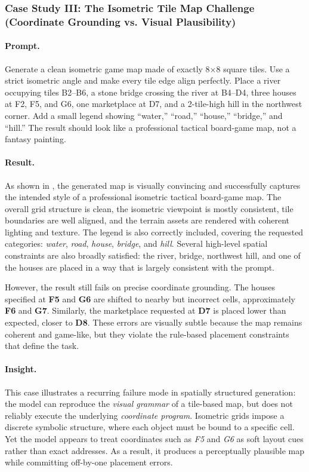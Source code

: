 \documentclass{llmxive}
\begin{document}
\subsubsection{Case Study III: The Isometric Tile Map Challenge (Coordinate Grounding vs. Visual Plausibility)}
\label{subsubsec:isometric_tile_map_case}

\paragraph{Prompt.}
Generate a clean isometric game map made of exactly 8$\times$8 square tiles. Use a strict isometric angle and make every tile edge align perfectly. Place a river occupying tiles B2--B6, a stone bridge crossing the river at B4--D4, three houses at F2, F5, and G6, one marketplace at D7, and a 2-tile-high hill in the northwest corner. Add a small legend showing ``water,'' ``road,'' ``house,'' ``bridge,'' and ``hill.'' The result should look like a professional tactical board-game map, not a fantasy painting.

\paragraph{Result.}
As shown in , the generated map is visually convincing and successfully captures the intended style of a professional isometric tactical board-game map. The overall grid structure is clean, the isometric viewpoint is mostly consistent, tile boundaries are well aligned, and the terrain assets are rendered with coherent lighting and texture. The legend is also correctly included, covering the requested categories: \textit{water}, \textit{road}, \textit{house}, \textit{bridge}, and \textit{hill}. Several high-level spatial constraints are also broadly satisfied: the river, bridge, northwest hill, and one of the houses are placed in a way that is largely consistent with the prompt.

However, the result still fails on precise coordinate grounding. The houses specified at \textbf{F5} and \textbf{G6} are shifted to nearby but incorrect cells, approximately \textbf{F6} and \textbf{G7}. Similarly, the marketplace requested at \textbf{D7} is placed lower than expected, closer to \textbf{D8}. These errors are visually subtle because the map remains coherent and game-like, but they violate the rule-based placement constraints that define the task.

\paragraph{Insight.}
This case illustrates a recurring failure mode in spatially structured generation: the model can reproduce the \emph{visual grammar} of a tile-based map, but does not reliably execute the underlying \emph{coordinate program}. Isometric grids impose a discrete symbolic structure, where each object must be bound to a specific cell. Yet the model appears to treat coordinates such as \textit{F5} and \textit{G6} as soft layout cues rather than exact addresses. As a result, it produces a perceptually plausible map while committing off-by-one placement errors.
\end{document}
